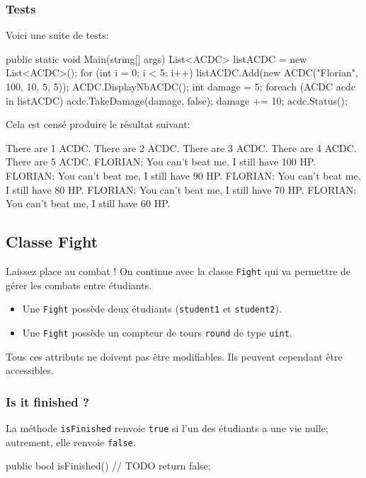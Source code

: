 \subsubsection{Tests}
Voici une suite de tests:
\begin{code}
public static void Main(string[] args)
{
	List<ACDC> listACDC = new List<ACDC>();
    for (int i = 0; i < 5; i++)
    {
    	listACDC.Add(new ACDC("Florian", 100, 10, 5, 5));
        ACDC.DisplayNbACDC();
    }
    int damage = 5; 
    foreach (ACDC acdc in listACDC)
    {
    	acdc.TakeDamage(damage, false);
    	damage += 10;
        acdc.Status();
    }
}
\end{code}
Cela est censé produire le résultat suivant:
\begin{shell}
There are 1 ACDC.
There are 2 ACDC.
There are 3 ACDC.
There are 4 ACDC.
There are 5 ACDC.
FLORIAN: You can't beat me, I still have 100 HP.
FLORIAN: You can't beat me, I still have 90 HP.
FLORIAN: You can't beat me, I still have 80 HP.
FLORIAN: You can't beat me, I still have 70 HP.
FLORIAN: You can't beat me, I still have 60 HP.
\end{shell}
\subsection{Classe Fight}

Laissez place au combat ! On continue avec la classe \texttt{Fight} qui va permettre de gérer les combats entre étudiants.

\begin{itemize}
\item Une \texttt{Fight} possède deux étudiants (\texttt{student1} et \texttt{student2}).
\item Une \texttt{Fight} possède un compteur de tours \texttt{round} de type \texttt{uint}.\\
\end{itemize}

\danger Tous ces attributs ne doivent pas être modifiables. Ils peuvent cependant être accessibles.

\subsubsection{Is it finished ?}

La méthode \texttt{isFinished} renvoie \texttt{true} si l'un des étudiants a une vie nulle; autrement, elle renvoie \texttt{false}.
\begin{code}
public bool isFinished()
{
    // TODO
    return false;
}
\end{code}

